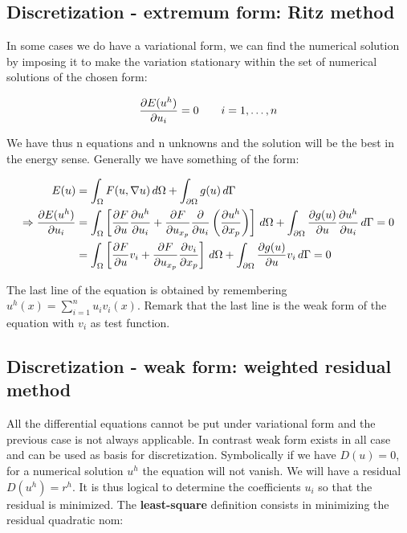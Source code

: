 \subsection{Discretization - extremum form: Ritz method}
In some cases we do have a variational form, we can find the numerical solution by imposing it to make the variation stationary within the set of numerical solutions of the chosen form: 

\begin{equation}
\frac{\partial E (u^h)}{\partial u_i} = 0 \qquad i = 1, \dots , n
\end{equation}

We have thus n equations and n unknowns and the solution will be the best in the energy sense. Generally we have something of the form: 

\begin{equation}
\begin{aligned}
E(u) &= \int _\Omega F(u,\nabla u) \, d\Omega + \int _{\partial \Omega} g(u) \, d\Gamma \\
\Rightarrow \frac{\partial E(u^h)}{\partial u_i} &= \int _\Omega \left[ \frac{\partial F}{\partial u}\frac{\partial u^h}{\partial u_i} + \frac{\partial F}{\partial u_{x_p}}\frac{\partial}{\partial u_i} \left( \frac{\partial u^h}{\partial x_{p}}\right) \right] \, d\Omega + \int _{\partial \Omega} \frac{\partial g(u)}{\partial u}\frac{\partial u^h}{\partial u_i} \, d\Gamma = 0\\
&= \int _\Omega \left[ \frac{\partial F}{\partial u}v _i + \frac{\partial F}{\partial u_{x_p}}\frac{\partial v _i}{\partial x_{p}} \right] \, d\Omega + \int _{\partial \Omega} \frac{\partial g(u)}{\partial u}v_i \, d\Gamma = 0
\end{aligned}
\end{equation}

The last line of the equation is obtained by remembering $u^h (x) = \sum _{i=1}^n u_i v_i (x)$. Remark that the last line is the weak form of the equation with $v_i$ as test function. 

\subsection{Discretization - weak form: weighted residual method}
All the differential equations cannot be put under variational form and the previous case is not always applicable. In contrast weak form exists in all case and can be used as basis for discretization. Symbolically if we have $D(u)= 0$, for a numerical solution $u^h$ the equation will not vanish. We will have a residual $D(u^h) = r^h$. It is thus logical to determine the coefficients $u_i$ so that the residual is minimized. The \textbf{least-square} definition consists in minimizing the residual quadratic nom: 

